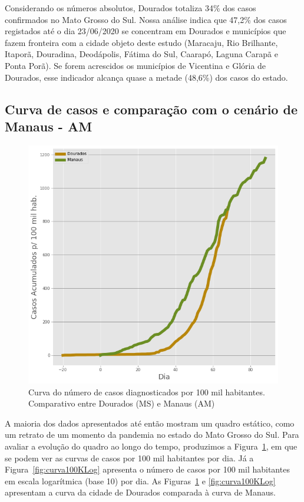 \documentclass[12pt]{article}
\begin{document}
Considerando os números absolutos, Dourados totaliza 34\% dos casos confirmados no Mato Grosso do Sul. Nossa análise indica que 47,2\% dos casos registados até o dia 23/06/2020 se concentram em Dourados e municípios que fazem fronteira com a cidade objeto deste estudo (Maracaju, Rio Brilhante, Itaporã, Douradina, Deodápolis, Fátima do Sul, Caarapó, Laguna Carapã e Ponta Porã). Se forem acrescidos os municípios de Vicentina e Glória de Dourados, esse indicador alcança quase a metade (48,6\%) dos casos do estado.

\subsection{Curva de casos e comparação com o cenário de Manaus - AM}\label{ssec:curvaMAU}

\begin{figure}[!htb]
  \centering
  \includegraphics[width=.6\textwidth]{figs/Dourados_Manaus_casos.png}
  \caption{Curva do número de casos diagnosticados por 100 mil habitantes. Comparativo entre Dourados (MS) e Manaus (AM)}
  \label{fig:curva100K}
  \end{figure}

A maioria dos dados apresentados até então mostram um quadro estático, como um retrato de um momento da pandemia no estado do Mato Grosso do Sul. Para avaliar a evolução do quadro ao longo do tempo, produzimos a Figura~\ref{fig:curva100K}, em que se podem ver as curvas de casos por 100 mil habitantes por dia. Já a Figura~\ref{fig:curva100KLog} apresenta o número de casos por 100 mil habitantes em escala logarítmica (base 10) por dia. As Figuras~\ref{fig:curva100K} e \ref{fig:curva100KLog} apresentam a curva da cidade de Dourados comparada à curva de Manaus.
\end{document}
